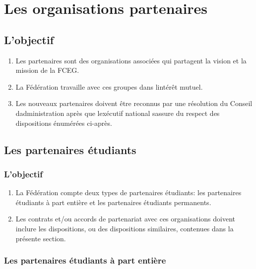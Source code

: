 \section{Les organisations partenaires}
\label{les-organisations-partenaires}

\subsection{L'objectif}
\label{lobjectif-1}

\begin{enumerate}
 \item
  Les partenaires sont des organisations associées qui partagent la vision et la mission de la FCEG.
 \item
  La Fédération travaille avec ces groupes dans l\textquotesingle intérêt mutuel.
 \item
  Les nouveaux partenaires doivent être reconnus par une résolution du Conseil d\textquotesingle administration après que l\textquotesingle exécutif national s\textquotesingle assure du respect des dispositions énumérées ci-après.
\end{enumerate}

\subsection{Les partenaires étudiants}
\label{les-partenaires-etudiants}

\subsubsection{L'objectif}
\label{lobjectif-2}

\begin{enumerate}
 \item
  La Fédération compte deux types de partenaires étudiants: les partenaires étudiants à part entière et les partenaires étudiants permanents.
 \item
  Les contrats et/ou accords de partenariat avec ces organisations doivent inclure les dispositions, ou des dispositions similaires, contenues dans la présente section.
\end{enumerate}

\subsubsection{Les partenaires étudiants à part entière}
\label{les-partenaires-etudiants-a-part-entiere}

